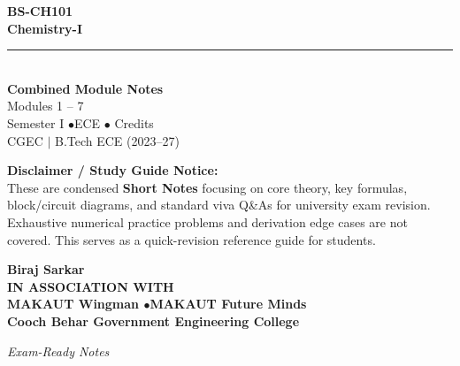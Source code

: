 \documentclass[12pt,a4paper]{article}
\begin{document}
\thispagestyle{empty}


\vspace*{1.0cm}
\begin{center}
  {\Huge\bfseries\color{myred} BS-CH101}\\[10pt]
  {\LARGE\bfseries\color{mydark} Chemistry-I}\\[20pt]
  {\color{myred}\rule{0.7\linewidth}{1.5pt}}\\[18pt]
  {\Large\color{myteal}\textbf{Combined Module Notes}}\\[8pt]
  {\large\color{mydark} Modules 1 -- 7}\\[40pt]
  {\normalsize\color{mydark} Semester I \quad$\bullet$\quad ECE \quad$\bullet$ Credits}\\[12pt]
  {\normalsize\color{mydark} CGEC \;$|$\; B.Tech ECE (2023--27)}
\end{center}
\vspace{1.0cm}
\begin{center}
  \begin{tcolorbox}[colback=mygray, colframe=mgframe, boxrule=0.5pt, arc=3pt, width=0.85\linewidth]
    \centering\small\color{mydark}
    \textbf{Disclaimer / Study Guide Notice:}\\
    These are condensed \textbf{Short Notes} focusing on core theory, key formulas, block/circuit diagrams, and standard viva Q\&As for university exam revision. Exhaustive numerical practice problems and derivation edge cases are not covered. This serves as a quick-revision reference guide for students.
  \end{tcolorbox}
\end{center}
\vfill
\vspace{0.6cm}
\begin{center}
  {\large\bfseries\color{mypurple} Biraj Sarkar}\\[16pt]
  {\footnotesize\color{watermark}\textbf{IN ASSOCIATION WITH}}\\[8pt]
  {\small\bfseries\color{mydark} MAKAUT Wingman \quad$\bullet$\quad MAKAUT Future Minds}\\[12pt]
  {\large\bfseries\color{myteal} Cooch Behar Government Engineering College}
\end{center}
\vfill
\begin{center}{\small\color{watermark}\textit{Exam-Ready Notes}}\end{center}
\clearpage
\end{document}
